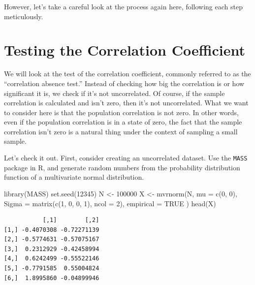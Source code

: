 \documentclass[
  a4paper,
]{book}
\newenvironment{Shaded}{\begin{snugshade}}{\end{snugshade}}
\newcommand{\AttributeTok}[1]{\textcolor[rgb]{0.40,0.45,0.13}{#1}}
\newcommand{\ConstantTok}[1]{\textcolor[rgb]{0.56,0.35,0.01}{#1}}
\newcommand{\DecValTok}[1]{\textcolor[rgb]{0.68,0.00,0.00}{#1}}
\newcommand{\FunctionTok}[1]{\textcolor[rgb]{0.28,0.35,0.67}{#1}}
\newcommand{\NormalTok}[1]{\textcolor[rgb]{0.00,0.23,0.31}{#1}}
\newcommand{\OtherTok}[1]{\textcolor[rgb]{0.00,0.23,0.31}{#1}}
\begin{document}
However, let's take a careful look at the process again here, following
each step meticulously.

\section{Testing the Correlation
Coefficient}\label{testing-the-correlation-coefficient}

We will look at the test of the correlation coefficient, commonly
referred to as the ``correlation absence test.'' Instead of checking how
big the correlation is or how significant it is, we check if it's not
uncorrelated. Of course, if the sample correlation is calculated and
isn't zero, then it's not uncorrelated. What we want to consider here is
that the population correlation is not zero. In other words, even if the
population correlation is in a state of zero, the fact that the sample
correlation isn't zero is a natural thing under the context of sampling
a small sample.

Let's check it out. First, consider creating an uncorrelated dataset.
Use the \texttt{MASS} package in R, and generate random numbers from the
probability distribution function of a multivariate normal distribution.

\begin{Shaded}
\begin{Highlighting}[]
\FunctionTok{library}\NormalTok{(MASS)}
\FunctionTok{set.seed}\NormalTok{(}\DecValTok{12345}\NormalTok{)}
\NormalTok{N }\OtherTok{\textless{}{-}} \DecValTok{100000}
\NormalTok{X }\OtherTok{\textless{}{-}} \FunctionTok{mvrnorm}\NormalTok{(N,}
  \AttributeTok{mu =} \FunctionTok{c}\NormalTok{(}\DecValTok{0}\NormalTok{, }\DecValTok{0}\NormalTok{),}
  \AttributeTok{Sigma =} \FunctionTok{matrix}\NormalTok{(}\FunctionTok{c}\NormalTok{(}\DecValTok{1}\NormalTok{, }\DecValTok{0}\NormalTok{, }\DecValTok{0}\NormalTok{, }\DecValTok{1}\NormalTok{), }\AttributeTok{ncol =} \DecValTok{2}\NormalTok{),}
  \AttributeTok{empirical =} \ConstantTok{TRUE}
\NormalTok{)}
\FunctionTok{head}\NormalTok{(X)}
\end{Highlighting}
\end{Shaded}

\begin{verbatim}
           [,1]        [,2]
[1,] -0.4070308 -0.72271139
[2,] -0.5774631 -0.57075167
[3,]  0.2312929 -0.42458994
[4,]  0.6242499 -0.55522146
[5,] -0.7791585  0.55004824
[6,]  1.8995860 -0.04899946
\end{verbatim}
\end{document}
